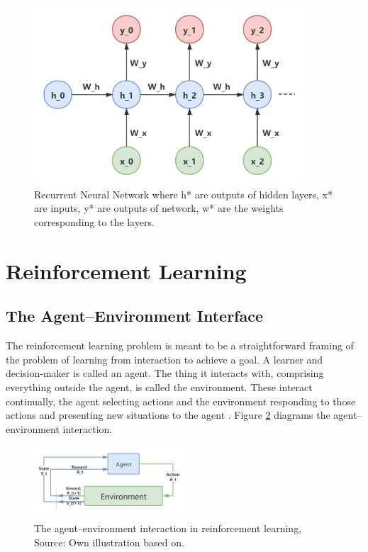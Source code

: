 \begin{figure}[htbp]
\centering
\includegraphics[width=0.9\textwidth]{./images/recurrent-layer-ann.png}
\caption{Recurrent Neural Network where h* are outputs of hidden layers, x* are inputs, y* are outputs of network, w* are the weights corresponding to the layers.}
\label{fig:recurrent-layer-ann}
\end{figure}

\section{Reinforcement Learning}
\subsection{The Agent–Environment Interface}
The reinforcement learning problem is meant to be a straightforward framing of the problem of learning from interaction to achieve a goal. A learner and decision-maker is called an agent. The thing it interacts with, comprising everything outside the agent, is called the environment. These interact continually, the agent selecting actions and the environment responding to those actions and presenting new situations to the agent \parencite{Sutton2018}. Figure \ref{fig:agent-environment-interaction} diagrams the agent–environment interaction.

\begin{figure}[htbp]
\centering
\includegraphics[width=0.5\textwidth]{./images/agent-environment-interaction.png}
\caption{The agent–environment interaction in reinforcement learning, Source: Own illustration based
on\parencite{Sutton2018}.}
\label{fig:agent-environment-interaction}
\end{figure}

